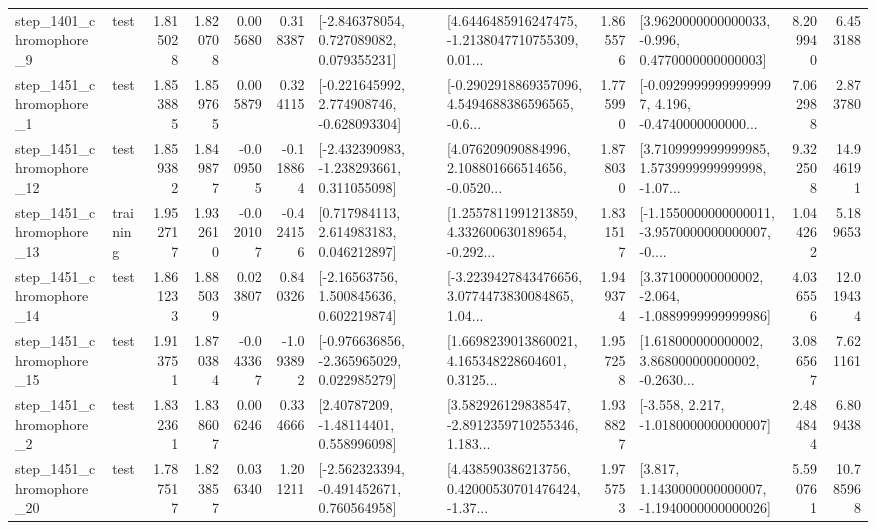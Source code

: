\begin{tabular}{llrrrrllrlrr}
  step\_1401\_chromophore\_9 &      test &      1.815028 &    1.820708 &      0.005680 &  0.318387 &    [-2.846378054, 0.727089082, 0.079355231] &  [4.6446485916247475, -1.2138047710755309, 0.01... &       1.865576 &   [3.9620000000000033, -0.996, 0.4770000000000003] &            8.209940 &          6.453188 \\
  step\_1451\_chromophore\_1 &      test &      1.853885 &    1.859765 &      0.005879 &  0.324115 &   [-0.221645992, 2.774908746, -0.628093304] &  [-0.2902918869357096, 4.5494688386596565, -0.6... &       1.775990 &  [-0.09299999999999997, 4.196, -0.4740000000000... &            7.062988 &          2.873780 \\
 step\_1451\_chromophore\_12 &      test &      1.859382 &    1.849877 &     -0.009505 & -0.118864 &   [-2.432390983, -1.238293661, 0.311055098] &  [4.076209090884996, 2.108801666514656, -0.0520... &       1.878030 &  [3.7109999999999985, 1.5739999999999998, -1.07... &            9.322508 &         14.946191 \\
 step\_1451\_chromophore\_13 &  training &      1.952717 &    1.932610 &     -0.020107 & -0.424156 &     [0.717984113, 2.614983183, 0.046212897] &  [1.2557811991213859, 4.332600630189654, -0.292... &       1.831517 &  [-1.1550000000000011, -3.9570000000000007, -0.... &            1.044262 &          5.189653 \\
 step\_1451\_chromophore\_14 &      test &      1.861233 &    1.885039 &      0.023807 &  0.840326 &     [-2.16563756, 1.500845636, 0.602219874] &  [-3.2239427843476656, 3.0774473830084865, 1.04... &       1.949374 &   [3.371000000000002, -2.064, -1.0889999999999986] &            4.036556 &         12.019434 \\
 step\_1451\_chromophore\_15 &      test &      1.913751 &    1.870384 &     -0.043367 & -1.093892 &   [-0.976636856, -2.365965029, 0.022985279] &  [1.6698239013860021, 4.165348228604601, 0.3125... &       1.957258 &  [1.618000000000002, 3.868000000000002, -0.2630... &            3.086567 &          7.621161 \\
  step\_1451\_chromophore\_2 &      test &      1.832361 &    1.838607 &      0.006246 &  0.334666 &      [2.40787209, -1.48114401, 0.558996098] &  [3.582926129838547, -2.8912359710255346, 1.183... &       1.938827 &               [-3.558, 2.217, -1.0180000000000007] &            2.484844 &          6.809438 \\
 step\_1451\_chromophore\_20 &      test &      1.787517 &    1.823857 &      0.036340 &  1.201211 &   [-2.562323394, -0.491452671, 0.760564958] &  [4.438590386213756, 0.42000530701476424, -1.37... &       1.975753 &   [3.817, 1.1430000000000007, -1.1940000000000026] &            5.590761 &         10.785968 \\

\end{tabular}
